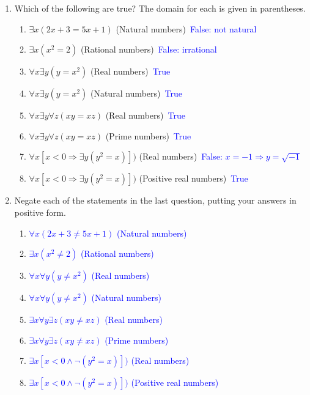 \documentclass[13.5pt]{article}
\begin{document}
\begin{enumerate}
\item{Which of the following are true? The domain for each is given in parentheses.}

\begin{enumerate}
\setlength{\itemindent}{.1in}
\item{\(\exists x(2x+3=5x+1)\) (Natural numbers)}\
\textcolor{blue} {False: not natural}
\item{\(\exists x(x^2=2)\) (Rational numbers)}\
\textcolor{blue} {False: irrational}
\item{\(\forall x \exists y(y=x^2)\) (Real numbers)}\
\textcolor{blue} {True}
\item{\(\forall x \exists y(y=x^2)\) (Natural numbers)}\
\textcolor{blue} {True}
\item{\(\forall x \exists y \forall z (xy=xz)\) (Real numbers)}\
\textcolor{blue} {True}
\item{\(\forall x \exists y \forall z (xy=xz)\) (Prime numbers)}\
\textcolor{blue} {True}
\item{\(\forall x[x<0 \Rightarrow \exists y(y^2=x)])\) (Real numbers)}\
\textcolor{blue} {False: \(x=-1 \Rightarrow y=\sqrt{-1}\)}
\item{\(\forall x[x<0 \Rightarrow \exists y(y^2=x)])\) (Positive real numbers)}\
\textcolor{blue} {True}
\end{enumerate}

\item{Negate each of the statements in the last question, putting your answers in positive form.}

\begin{enumerate}
\setlength{\itemindent}{.1in}
\item \textcolor{blue} {\(\forall x(2x+3\neq5x+1)\) (Natural numbers)}\
\item \textcolor{blue} {\(\exists x(x^2\neq2)\) (Rational numbers)}\
\item \textcolor{blue} {\(\forall x \forall y(y\neq x^2)\) (Real numbers)}\
\item \textcolor{blue} {\(\forall x \forall y(y\neq x^2)\) (Natural numbers)}\
\item \textcolor{blue} {\(\exists x \forall y \exists z (xy\neq xz)\) (Real numbers)}\
\item \textcolor{blue} {\(\exists x \forall y \exists z (xy\neq xz)\) (Prime numbers)}\
\item \textcolor{blue} {\(\exists x[x<0 \wedge \neg (y^2=x)])\) (Real numbers)}\
\item \textcolor{blue} {\(\exists x[x<0 \wedge \neg (y^2=x)])\) (Positive real numbers)}\
\end{enumerate}


\end{enumerate}
\end{document}
